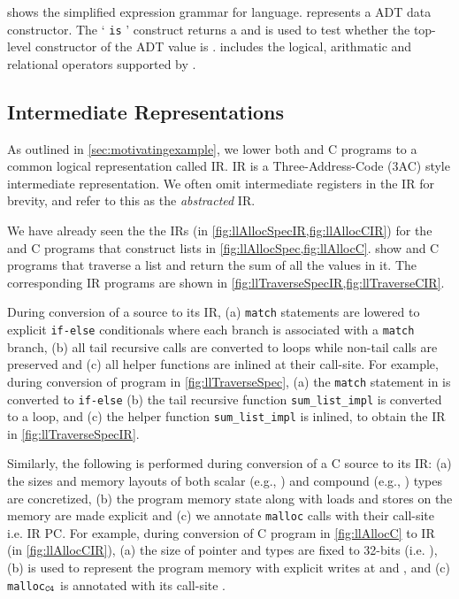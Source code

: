 

 shows the simplified expression grammar for \SpecL{} language.
 represents a ADT data constructor.
The ` {\tt is} ' construct returns a  and is used to test whether the top-level constructor
of the ADT value  is .
 includes the logical, arithmatic and relational operators supported by \SpecL{}.

\subsection{Intermediate Representations}
\label{sec:ir}
As outlined in \cref{sec:motivatingexample}, we lower both \SpecL{} and C programs to a common
logical representation called IR.
IR is a Three-Address-Code (3AC) style intermediate representation.
We often omit intermediate registers in the IR for brevity,
and refer to this as the {\em abstracted} IR.




We have already seen the the IRs (in \cref{fig:llAllocSpecIR,fig:llAllocCIR}) for the \SpecL{} and C programs
that construct lists in \cref{fig:llAllocSpec,fig:llAllocC}.
 show \SpecL{} and C programs that traverse a list
and return the sum of all the values in it.
The corresponding IR programs are shown in \cref{fig:llTraverseSpecIR,fig:llTraverseCIR}.

During conversion of a \SpecL{} source to its IR,
(a) {\tt match} statements are lowered to explicit {\tt if-else} conditionals where each branch
is associated with a {\tt match} branch,
(b) all tail recursive calls are converted to loops while non-tail calls are preserved and
(c) all helper functions are inlined at their call-site.
For example, during conversion of \SpecL{} program in \cref{fig:llTraverseSpec},
(a) the {\tt match} statement in  is converted to {\tt if-else}
(b) the tail recursive function {\tt sum\_list\_impl} is converted to a loop,
and (c) the helper function {\tt sum\_list\_impl} is inlined,
to obtain the IR in \cref{fig:llTraverseSpecIR}.

Similarly, the following is performed during conversion of a C source to its IR:
(a) the sizes and memory layouts of both scalar (e.g., )
and compound (e.g., ) types are concretized,
(b) the program memory state along with loads and stores on the memory are made explicit and
(c) we annotate {\tt malloc} calls with their call-site i.e. IR PC.
For example, during conversion of C program in \cref{fig:llAllocC} to IR (in \cref{fig:llAllocCIR}),
(a) the size of pointer and  types are fixed to 32-bits (i.e. ),
(b) \mem{} is used to represent the program memory with explicit writes at  and ,
and (c) {\tt malloc$_{{\tt C4}}$} is annotated with its call-site .

